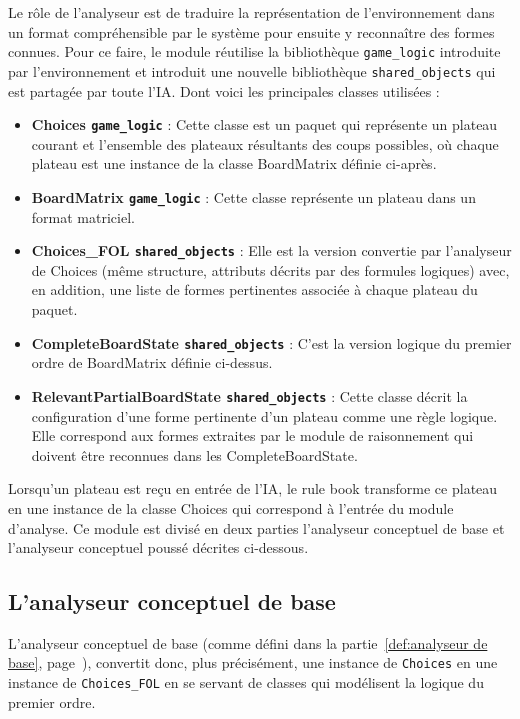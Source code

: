 Le rôle de l'analyseur est de traduire la représentation de l'environnement dans un format compréhensible par le système pour ensuite y reconnaître des formes connues. Pour ce faire, le module réutilise la bibliothèque \texttt{game\_logic} introduite par l'environnement et introduit une nouvelle bibliothèque \texttt{shared\_objects} qui est partagée par toute l'IA. Dont voici les principales classes utilisées :
\begin{itemize}
  \item \textbf {Choices \texttt{game\_logic}} : Cette classe est un paquet qui représente un plateau courant et l'ensemble des plateaux résultants des coups possibles, où chaque plateau est une instance de la classe BoardMatrix définie ci-après. 
  \item \textbf {BoardMatrix \texttt{game\_logic}} : Cette classe représente un plateau dans un format matriciel. 
  \item \textbf {Choices\_FOL \texttt{shared\_objects}} : Elle est la version convertie par l'analyseur de Choices (même structure, attributs décrits par des formules logiques) avec, en addition, une liste de formes pertinentes associée à chaque plateau du paquet.
  \item \textbf {CompleteBoardState \texttt{shared\_objects}} : C'est la version logique du premier ordre de
  BoardMatrix définie ci-dessus.
  \item \textbf {RelevantPartialBoardState \texttt{shared\_objects}} : Cette classe décrit la configuration d'une forme pertinente d'un plateau comme une règle logique. Elle correspond aux formes extraites par le module de raisonnement qui doivent être reconnues dans les CompleteBoardState.
\end{itemize}

Lorsqu'un plateau est reçu en entrée de l'IA, le \og rule book \fg{} transforme ce plateau en une instance de la classe \og Choices \fg{} qui correspond à l'entrée du module d'analyse. Ce module est divisé en deux parties \og l'analyseur conceptuel de base \fg{} et \og l'analyseur conceptuel poussé \fg{} décrites ci-dessous.
 
\subsection{L'analyseur conceptuel de base}
L'analyseur conceptuel de base (comme défini dans la partie~\ref{def:analyseur de base}, page~\pageref{def:analyseur de base}), convertit donc, plus précisément, une instance de \texttt{Choices} en une instance de \texttt{Choices\_FOL} en se servant de classes qui modélisent la logique du premier ordre. 

